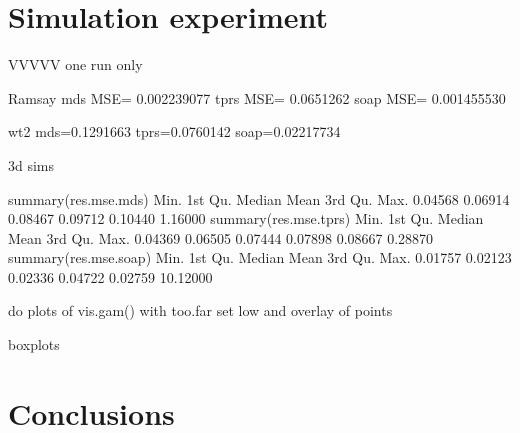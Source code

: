 \documentclass[a4paper,10pt]{amsart}
\begin{document}
\section{Simulation experiment}


VVVVV one run only

Ramsay
mds MSE= 0.002239077 
tprs MSE= 0.0651262 
soap MSE= 0.001455530 


wt2
mds=0.1291663
tprs=0.0760142
soap=0.02217734


3d sims

 summary(res.mse.mds)
   Min. 1st Qu.  Median    Mean 3rd Qu.    Max. 
0.04568 0.06914 0.08467 0.09712 0.10440 1.16000 
 summary(res.mse.tprs)
   Min. 1st Qu.  Median    Mean 3rd Qu.    Max. 
0.04369 0.06505 0.07444 0.07898 0.08667 0.28870 
 summary(res.mse.soap)
    Min.  1st Qu.   Median     Mean  3rd Qu.     Max. 
 0.01757  0.02123  0.02336  0.04722  0.02759 10.12000 





do plots of vis.gam() with too.far set low and overlay of points

boxplots



\section{Conclusions}




\end{document}
